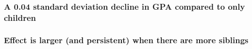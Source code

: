 \documentclass{beamer}
\begin{document}



    

\begin{frame}
    \label{frame:eventstudy}
    \frametitle{A 0.04 standard deviation decline in GPA compared to only children}
        {
    }
\end{frame}

\begin{frame}
    \label{frame:eventstudy_bysibs}
    \frametitle{Effect is larger (and persistent) when there are more siblings}
        {
    }
\end{frame}
\end{document}
